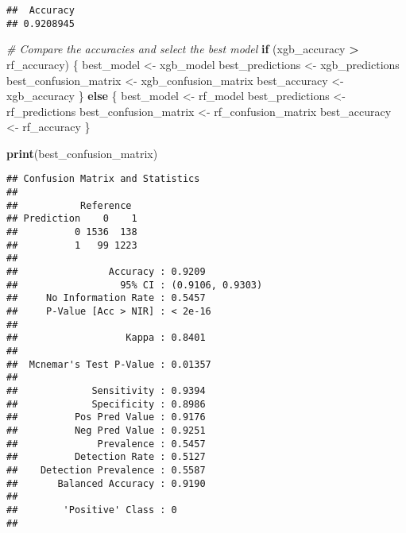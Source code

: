 \documentclass[
]{article}
\newenvironment{Shaded}{\begin{snugshade}}{\end{snugshade}}
\newcommand{\CommentTok}[1]{\textcolor[rgb]{0.56,0.35,0.01}{\textit{#1}}}
\newcommand{\ControlFlowTok}[1]{\textcolor[rgb]{0.13,0.29,0.53}{\textbf{#1}}}
\newcommand{\FunctionTok}[1]{\textcolor[rgb]{0.13,0.29,0.53}{\textbf{#1}}}
\newcommand{\NormalTok}[1]{#1}
\newcommand{\OtherTok}[1]{\textcolor[rgb]{0.56,0.35,0.01}{#1}}
\newcommand{\SpecialCharTok}[1]{\textcolor[rgb]{0.81,0.36,0.00}{\textbf{#1}}}
\begin{document}
\begin{verbatim}
##  Accuracy 
## 0.9208945
\end{verbatim}

\begin{Shaded}
\begin{Highlighting}[]
\CommentTok{\# Compare the accuracies and select the best model}
\ControlFlowTok{if}\NormalTok{ (xgb\_accuracy }\SpecialCharTok{\textgreater{}}\NormalTok{ rf\_accuracy) \{}
\NormalTok{  best\_model }\OtherTok{\textless{}{-}}\NormalTok{ xgb\_model}
\NormalTok{  best\_predictions }\OtherTok{\textless{}{-}}\NormalTok{ xgb\_predictions}
\NormalTok{  best\_confusion\_matrix }\OtherTok{\textless{}{-}}\NormalTok{ xgb\_confusion\_matrix}
\NormalTok{  best\_accuracy }\OtherTok{\textless{}{-}}\NormalTok{ xgb\_accuracy}
\NormalTok{\} }\ControlFlowTok{else}\NormalTok{ \{}
\NormalTok{  best\_model }\OtherTok{\textless{}{-}}\NormalTok{ rf\_model}
\NormalTok{  best\_predictions }\OtherTok{\textless{}{-}}\NormalTok{ rf\_predictions}
\NormalTok{  best\_confusion\_matrix }\OtherTok{\textless{}{-}}\NormalTok{ rf\_confusion\_matrix}
\NormalTok{  best\_accuracy }\OtherTok{\textless{}{-}}\NormalTok{ rf\_accuracy}
\NormalTok{\}}

\FunctionTok{print}\NormalTok{(best\_confusion\_matrix)}
\end{Highlighting}
\end{Shaded}

\begin{verbatim}
## Confusion Matrix and Statistics
## 
##           Reference
## Prediction    0    1
##          0 1536  138
##          1   99 1223
##                                           
##                Accuracy : 0.9209          
##                  95% CI : (0.9106, 0.9303)
##     No Information Rate : 0.5457          
##     P-Value [Acc > NIR] : < 2e-16         
##                                           
##                   Kappa : 0.8401          
##                                           
##  Mcnemar's Test P-Value : 0.01357         
##                                           
##             Sensitivity : 0.9394          
##             Specificity : 0.8986          
##          Pos Pred Value : 0.9176          
##          Neg Pred Value : 0.9251          
##              Prevalence : 0.5457          
##          Detection Rate : 0.5127          
##    Detection Prevalence : 0.5587          
##       Balanced Accuracy : 0.9190          
##                                           
##        'Positive' Class : 0               
## 
\end{verbatim}
\end{document}
